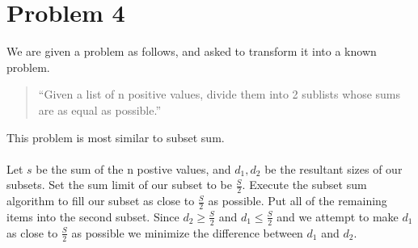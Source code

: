 \section*{Problem 4}

We are given a problem as follows, and asked to transform it into a known problem.
\begin{quote}
``Given a list of n positive values, divide them into 2 sublists whose sums are as equal as possible.''
\end{quote}
This problem is most similar to subset sum.
\\
\\
Let $s$ be the sum of the n postive values, and $d_1,d_2$ be the resultant sizes of our subsets.
Set the sum limit of our subset to be $\frac{S}{2}$. Execute the subset sum algorithm to fill our 
subset as close to $\frac{S}{2}$ as possible. Put all of the remaining items into the second subset. 
Since $d_2 \ge \frac{S}{2}$ and $d_1 \le \frac{S}{2}$ and we attempt to make $d_1$ as close to 
$\frac{S}{2}$ as possible we minimize the difference between $d_1$ and $d_2$.

